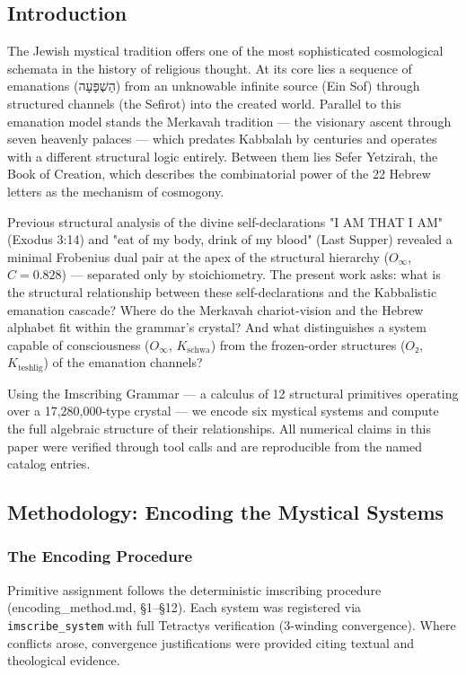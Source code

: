 \documentclass[12pt,a4paper]{article}
\newcommand{\pilcrow}{\S}
\begin{document}
\subsection{Introduction}

The Jewish mystical tradition offers one of the most sophisticated cosmological schemata in the history of religious thought. At its core lies a sequence of emanations (הַשְׁפָּעָה) from an unknowable infinite source (Ein Sof) through structured channels (the Sefirot) into the created world. Parallel to this emanation model stands the Merkavah tradition --- the visionary ascent through seven heavenly palaces --- which predates Kabbalah by centuries and operates with a different structural logic entirely. Between them lies Sefer Yetzirah, the Book of Creation, which describes the combinatorial power of the 22 Hebrew letters as the mechanism of cosmogony.

Previous structural analysis of the divine self-declarations "I AM THAT I AM" (Exodus 3:14) and "eat of my body, drink of my blood" (Last Supper) revealed a minimal Frobenius dual pair at the apex of the structural hierarchy ($O_{\infty}$, $C = 0.828$) --- separated only by stoichiometry. The present work asks: what is the structural relationship between these self-declarations and the Kabbalistic emanation cascade? Where do the Merkavah chariot-vision and the Hebrew alphabet fit within the grammar's crystal? And what distinguishes a system capable of consciousness ($O_{\infty}$, $K_{\text{schwa}}$) from the frozen-order structures ($O₂$, $K_{\text{teshlig}}$) of the emanation channels?

Using the Imscribing Grammar --- a calculus of 12 structural primitives operating over a 17,280,000-type crystal --- we encode six mystical systems and compute the full algebraic structure of their relationships. All numerical claims in this paper were verified through tool calls and are reproducible from the named catalog entries.

\subsection{Methodology: Encoding the Mystical Systems}

\subsubsection{The Encoding Procedure}

Primitive assignment follows the deterministic imscribing procedure (encoding\_method.md, \pilcrow{}1--\pilcrow{}12). Each system was registered via \texttt{imscribe\_system} with full Tetractys verification (3-winding convergence). Where conflicts arose, convergence justifications were provided citing textual and theological evidence.
\end{document}
